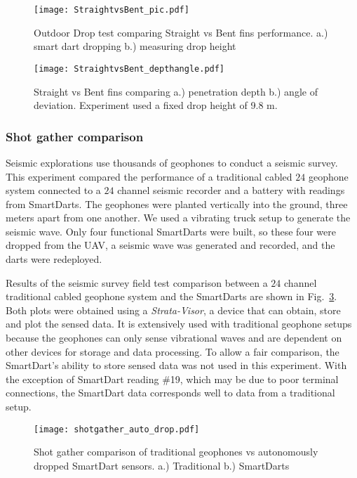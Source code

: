 \begin{figure} \centering
  {\texttt{[image: StraightvsBent\_pic.pdf]}}
 \caption{Outdoor Drop test comparing Straight vs Bent fins performance.
 a.)  smart dart dropping 
 b.)  measuring drop height} 
 \label{fig:StraightBentPic}
 \vspace{-1em}
\end{figure}
\begin{figure} \centering
  {\texttt{[image: StraightvsBent\_depthangle.pdf]}}
 \caption{\label{fig:StraightBentDepth}Straight vs Bent fins comparing a.) penetration depth b.) angle of deviation. Experiment used a fixed drop height of 9.8 m.} 
\end{figure}
\subsubsection{Shot gather comparison}
Seismic explorations use thousands of geophones to conduct a seismic survey. 
This experiment compared the performance of a traditional cabled $24$ geophone system connected to a $24$ channel seismic recorder and a battery with readings from SmartDarts.
The geophones were planted vertically into the ground, three meters apart from one another.  
We used a vibrating truck setup to generate the seismic wave. 
Only four functional SmartDarts were built, so these four were dropped from the UAV, a seismic wave was generated and recorded, and the darts were redeployed.

Results of the seismic survey field test comparison between a $24$ channel traditional cabled geophone system and the SmartDarts are shown in Fig.~\ref{fig:shotgather_auto_drop}.  
Both plots were obtained using a \emph{Strata-Visor}, a device that can obtain, store and plot the sensed data. 
It is extensively used with traditional geophone setups because the geophones can only sense vibrational waves and are dependent on other devices for storage and data processing. 
To allow a fair comparison, the SmartDart's  ability to store sensed data was not used in this experiment. 
With the exception of SmartDart reading \#19, which may be due to poor terminal connections, the SmartDart data corresponds well to data from a traditional setup.


\begin{figure} \centering
  {\texttt{[image: shotgather\_auto\_drop.pdf]}}
 \caption{Shot gather comparison of traditional geophones vs autonomously dropped SmartDart sensors. a.) Traditional b.) SmartDarts} 
 \label{fig:shotgather_auto_drop}
\end{figure}


 